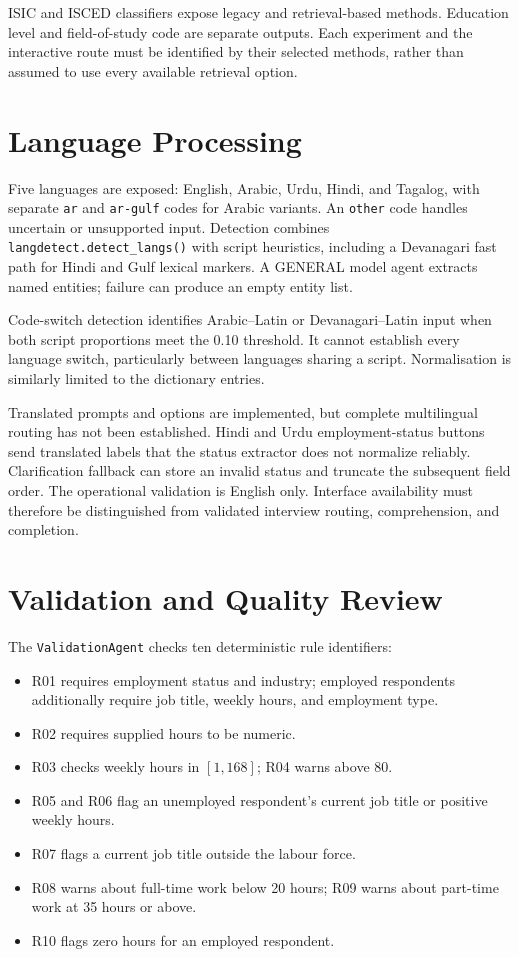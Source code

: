ISIC and ISCED classifiers expose legacy and retrieval-based methods.
Education level and field-of-study code are separate outputs. Each
experiment and the interactive route must be identified by their selected
methods, rather than assumed to use every available retrieval option.

\section{Language Processing}
\label{sec:impl-lang}

Five languages are exposed: English, Arabic, Urdu, Hindi, and Tagalog,
with separate \texttt{ar} and \texttt{ar-gulf} codes for Arabic variants.
An \texttt{other} code handles uncertain or unsupported input. Detection
combines \texttt{langdetect.detect\_langs()} with script heuristics,
including a Devanagari fast path for Hindi and Gulf lexical markers.
A GENERAL model agent extracts named entities; failure can produce an
empty entity list.

Code-switch detection identifies Arabic--Latin or Devanagari--Latin input
when both script proportions meet the 0.10 threshold. It cannot establish
every language switch, particularly between languages sharing a script.
Normalisation is similarly limited to the dictionary entries.

Translated prompts and options are implemented, but complete multilingual
routing has not been established. Hindi and Urdu employment-status buttons
send translated labels that the status extractor does not normalize
reliably. Clarification fallback can store an invalid status and truncate
the subsequent field order. The operational validation is English only.
Interface availability must therefore be distinguished from validated
interview routing, comprehension, and completion.

\section{Validation and Quality Review}
\label{sec:impl-validation}

The \texttt{ValidationAgent} checks ten deterministic rule identifiers:
\begin{itemize}
  \item R01 requires employment status and industry; employed respondents
  additionally require job title, weekly hours, and employment type.
  \item R02 requires supplied hours to be numeric.
  \item R03 checks weekly hours in $[1,168]$; R04 warns above 80.
  \item R05 and R06 flag an unemployed respondent's current job title or
  positive weekly hours.
  \item R07 flags a current job title outside the labour force.
  \item R08 warns about full-time work below 20 hours; R09 warns about
  part-time work at 35 hours or above.
  \item R10 flags zero hours for an employed respondent.
\end{itemize}

